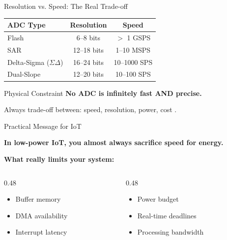 \documentclass[aspectratio=169,11pt]{beamer}
\begin{document}
\begin{frame}{Resolution vs. Speed: The Real Trade-off}
    \begin{table}
        \centering
        \begin{tabular}{lcc}
            \toprule
            \textbf{ADC Type} & \textbf{Resolution} & \textbf{Speed} \\
            \midrule
            Flash & 6--8 bits & $>$ 1 GSPS \\
            SAR & 12--18 bits & 1--10 MSPS \\
            Delta-Sigma ($\Sigma\Delta$) & 16--24 bits & 10--1000 SPS \\
            Dual-Slope & 12--20 bits & 10--100 SPS \\
            \bottomrule
        \end{tabular}
    \end{table}
    
    \vspace{0.3cm}
    \begin{block}{Physical Constraint}
        \textbf{No ADC is infinitely fast AND precise.}
        
        Always trade-off between: speed, resolution, power, cost \cite{kester2005data}.
    \end{block}
\end{frame}

\begin{frame}{Practical Message for IoT}
    \begin{center}
        \Large
        \textbf{In low-power IoT, you almost always sacrifice speed for energy.}
    \end{center}
    
    \vspace{0.5cm}
    \textbf{What really limits your system:}
    \begin{columns}[T]
        \begin{column}{0.48\textwidth}
            \begin{itemize}
                \item Buffer memory
                \item DMA availability
                \item Interrupt latency
            \end{itemize}
        \end{column}
        \begin{column}{0.48\textwidth}
            \begin{itemize}
                \item Power budget
                \item Real-time deadlines
                \item Processing bandwidth
            \end{itemize}
        \end{column}
    \end{columns}
    
    \vspace{0.3cm}
    \footnotesize
    \cite{wolf2012computers}
\end{frame}
\end{document}
